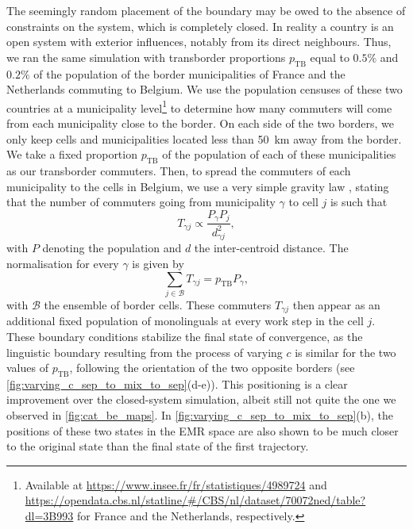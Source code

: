 \documentclass[../thesis.tex]{subfiles}
\begin{document}
The seemingly random placement of the boundary may be owed to the absence of constraints
on the system, which is completely closed. In reality a country is an open system with
exterior influences, notably from its direct neighbours. Thus, we ran the same
simulation with transborder proportions $p_{\text{TB}}$ equal to $0.5\%$ and $0.2\%$ of
the population of the border municipalities of France and the Netherlands commuting to
Belgium. We use the population censuses of these two countries at a municipality
level\footnote{Available at \url{https://www.insee.fr/fr/statistiques/4989724} and
\url{https://opendata.cbs.nl/statline/\#/CBS/nl/dataset/70072ned/table?dl=3B993} for
France and the Netherlands, respectively.} to determine how many commuters will come
from each municipality close to the border. On each side of the two borders, we only
keep cells and municipalities located less than \SI{50}{\kilo \meter} away from the
border. We take a fixed proportion $p_{\text{TB}}$ of the population of each of these
municipalities as our transborder commuters. Then, to spread the commuters of each
municipality to the cells in Belgium, we use a very simple gravity law
\cite{SenGravityModels1995}, stating that the number of commuters going from
municipality $\gamma$ to cell $j$ is such that
\begin{equation}
  T_{\gamma j} \propto \frac{P_\gamma P_j}{d_{\gamma j}^2},
\end{equation}
with $P$ denoting the population and $d$ the inter-centroid distance. The normalisation
for every $\gamma$ is given by
\begin{equation}
  \sum_{j \in \mathcal{B}} T_{\gamma j} = p_{\text{TB}} P_\gamma,
\end{equation}
with $\mathcal{B}$ the ensemble of border cells. These commuters $T_{\gamma j}$ then
appear as an additional fixed population of monolinguals at every work step in the cell
$j$. These boundary conditions stabilize the final state of convergence, as the
linguistic boundary resulting from the process of varying $c$ is similar for the two
values of $p_{\text{TB}}$, following the orientation of the two opposite borders (see
\cref{fig:varying_c_sep_to_mix_to_sep}(d-e)). This positioning is a clear improvement
over the closed-system simulation, albeit still not quite the one we observed in
\cref{fig:cat_be_maps}. In \cref{fig:varying_c_sep_to_mix_to_sep}(b), the positions of
these two states in the \ac{EMR} space are also shown to be much closer to the original
state than the final state of the first trajectory.
\end{document}
